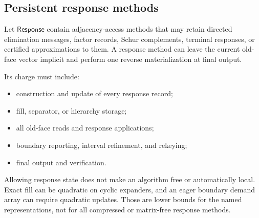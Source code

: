 \subsection{Persistent response methods}

Let $\mathsf{Response}$ contain adjacency-access methods that may retain
directed elimination messages, factor records, Schur complements, terminal
responses, or certified approximations to them.  A response method can leave
the current old-face vector implicit and perform one reverse materialization
at final output.

Its charge must include:

\begin{itemize}
\item construction and update of every response record;
\item fill, separator, or hierarchy storage;
\item all old-face reads and response applications;
\item boundary reporting, interval refinement, and rekeying;
\item final output and verification.
\end{itemize}

Allowing response state does not make an algorithm free or automatically
local.  Exact fill can be quadratic on cyclic expanders, and an eager boundary
demand array can require quadratic updates.  Those are lower bounds for the
named representations, not for all compressed or matrix-free response
methods.
